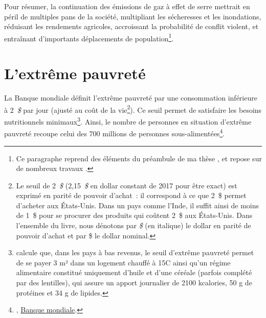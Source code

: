 \documentclass[a5paper,french,openany]{memoir}
\begin{document}
Pour résumer, la continuation des émissions de gaz à effet de serre mettrait en péril de multiples pans de la société, multipliant les sécheresses et les inondations, réduisant les rendements agricoles, accroissant la probabilité de conflit violent, et entraînant d'importants déplacements de population\footnote{Ce paragraphe reprend des éléments du préambule de ma thèse \citep{fabre_is_2020}, et repose sur de nombreux travaux \citep{cattaneo_human_2019,carleton_social_2016,dell_temperature_2012}.}. 


\section{L'extrême pauvreté} %

La Banque mondiale définit l'extrême pauvreté par une consommation inférieure à 2~\textit{\$} par jour (ajusté au coût de la vie\footnote{Le seuil de 2~\textit{\$} (2,15~\textit{\$} en dollar constant de 2017 pour être exact) est exprimé en parité de pouvoir d'achat~: il correspond à ce que 2~\$ permet d'acheter aux États-Unis. Dans un pays comme l'Inde, il suffit ainsi de moins de 1~\$ pour se procurer des produits qui coûtent 2~\$ aux États-Unis. Dans l'ensemble du livre, nous dénotons par \textit{\$} (en italique) le dollar en parité de pouvoir d'achat et par \$ le dollar nominal.}). %
Ce seuil permet de satisfaire les besoins nutritionnels minimaux\footnote{\citet{allen_absolute_2017-1} calcule que, dans les pays à bas revenus, le seuil d'extrême pauvreté permet de se payer 3 m² dans un logement chauffé à 15\textdegree{}C ainsi qu'un régime alimentaire constitué uniquement d'huile et d'une céréale (parfois complété par des lentilles), qui assure un apport journalier de 2100 kcalories, 50 g de protéines et 34 g de lipides.}. Ainsi, le nombre de personnes en situation d'extrême pauvreté recoupe celui des 700 millions de personnes sous-alimentées\footnote{\citet{fao_state_2023}, \href{https://data.worldbank.org/indicator/SI.POV.DDAY?end=2019&locations=MW-1W&start=1990&view=chart}{Banque mondiale}.}. 
\end{document}
